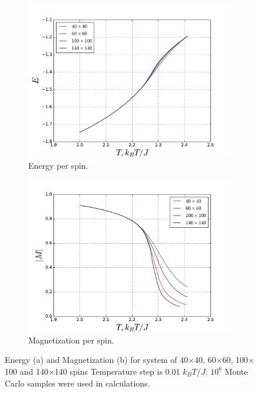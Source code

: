 \documentclass[10pt]{article}
\begin{document}
\begin{figure}
\centering
   \begin{subfigure}[b]{1\textwidth}
   \includegraphics[width=0.9\linewidth]{phase_10_6_energy}
   \caption{Energy per spin.}
   \label{fig:phase_energy} 
\end{subfigure}

\begin{subfigure}[b]{1\textwidth}
   \includegraphics[width=0.9\linewidth]{phase_10_6_magnetization}
   \caption{Magnetization per spin.}
   \label{fig:phase_magnetiz}
\end{subfigure}
\caption{Energy (a) and Magnetization (b) for system of 40$\times$40, 60$\times$60, 100$\times$100 and 140$\times$140 spins
Temperature step is 0.01 $k_BT/J$. $10^6$ Monte Carlo samples were used in calculations.}
\end{figure}
\clearpage
\end{document}
